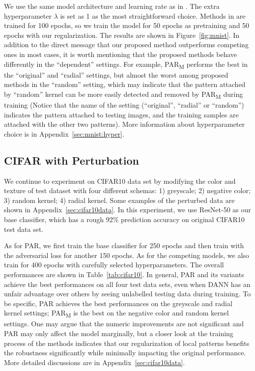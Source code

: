 \documentclass{article}
\begin{document}
We use the same model architecture and learning rate as in \citet{wang2018learning}. 
The extra hyperparameter $\lambda$ is set as 1 as the most straightforward choice. Methods in \citet{wang2018learning} are trained for 100 epochs, 
so we train the model for 50 epochs as pretraining 
and 50 epochs with our regularization. 
The results are shown in Figure~\ref{fig:mnist}. 
In addition to the direct message 
that our proposed method outperforms competing ones in most cases, 
it is worth mentioning that the proposed methods 
behave differently in the ``dependent'' settings. 
For example,
PAR\textsubscript{M} performs the best in the ``original'' and ``radial'' settings, 
but almost the worst among proposed methods in the ``random'' setting,
which may indicate that the pattern attached by ``random'' kernel 
can be more easily detected and removed by PAR\textsubscript{M} 
during training (Notice that the name of the setting (``original'', ``radial'' or ``random'') 
indicates the pattern attached to testing images, 
and the training samples are attached with the other two patterns).
More information about hyperparameter choice is in Appendix~\ref{sec:mnist:hyper}. 

\subsection{CIFAR with Perturbation}

We continue to experiment on CIFAR10 data set by modifying the color and texture of test dataset with four different schemas:
1) greyscale; 2) negative color; 3) random kernel; 4) radial kernel. Some examples of the perturbed data are shown in Appendix~\ref{sec:cifar10data}. In this experiment, we use ResNet-50 as our base classifier, which has a rough 92\% prediction accuracy on original CIFAR10 test data set. 


As for PAR, 
we first train the base classifier 
for 250 epochs 
and then train with the adversarial loss for another 150 epochs. As for the competing models, we also train for 400 epochs with carefully selected hyperparameters.
The overall performances 
are shown in Table~\ref{tab:cifar10}. 
In general, PAR and its variants achieve the best performances 
on all four test data sets, 
even when DANN has an unfair advantage over others by seeing unlabelled testing data during training. 
To be specific, PAR achieves 
the best performances on the greyscale and radial kernel settings;
PAR\textsubscript{M} is the best on the negative color and random kernel settings.
One may argue that the numeric improvements are not significant and PAR may only affect the model marginally, 
but a closer look at the training process of the methods indicates that our regularization of local patterns benefits the robustness significantly while minimally impacting the original performance. 
More detailed discussions are in Appendix~\ref{sec:cifar10data}.
\end{document}
